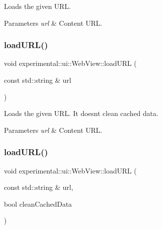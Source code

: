Loads the given U\+RL.


\begin{DoxyParams}{Parameters}
{\em url} & Content U\+RL. \\
\hline
\end{DoxyParams}
\mbox{\label{classexperimental_1_1ui_1_1WebView_ac6824942bb8915c2b662ce185e9c82ee}} 
\subsubsection{\texorpdfstring{load\+U\+R\+L()}{loadURL()}\hspace{0.1cm}{\footnotesize\ttfamily [2/3]}}
{\footnotesize\ttfamily void experimental\+::ui\+::\+Web\+View\+::load\+U\+RL (\begin{DoxyParamCaption}\item[{const std\+::string \&}]{url }\end{DoxyParamCaption})}

Loads the given U\+RL. It doesn\textquotesingle{}t clean cached data.


\begin{DoxyParams}{Parameters}
{\em url} & Content U\+RL. \\
\hline
\end{DoxyParams}
\mbox{\label{classexperimental_1_1ui_1_1WebView_a86d715307de312c6a5dd5a49ba90aa4d}} 
\subsubsection{\texorpdfstring{load\+U\+R\+L()}{loadURL()}\hspace{0.1cm}{\footnotesize\ttfamily [3/3]}}
{\footnotesize\ttfamily void experimental\+::ui\+::\+Web\+View\+::load\+U\+RL (\begin{DoxyParamCaption}\item[{const std\+::string \&}]{url,  }\item[{bool}]{clean\+Cached\+Data }\end{DoxyParamCaption})}

